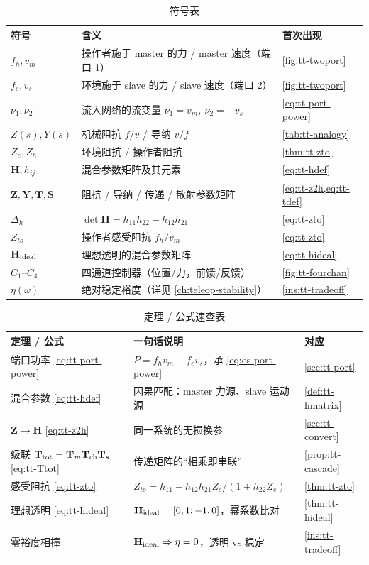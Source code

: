 \begin{table}[H]\centering\small
\caption{符号表}
\label{tab:tt-symbols}
\begin{tabular}{lll}
\toprule
符号 & 含义 & 首次出现 \\
\midrule
$f_h,v_m$ & 操作者施于 master 的力 / master 速度（端口 1） & \cref{fig:tt-twoport} \\
$f_e,v_s$ & 环境施于 slave 的力 / slave 速度（端口 2） & \cref{fig:tt-twoport} \\
$\nu_1,\nu_2$ & 流入网络的流变量 $\nu_1=v_m,\ \nu_2=-v_s$ & \cref{eq:tt-port-power} \\
$Z(s),Y(s)$ & 机械阻抗 $f/v$ / 导纳 $v/f$ & \cref{tab:tt-analogy} \\
$Z_e,Z_h$ & 环境阻抗 / 操作者阻抗 & \cref{thm:tt-zto} \\
$\mathbf H,h_{ij}$ & 混合参数矩阵及其元素 & \cref{eq:tt-hdef} \\
$\mathbf Z,\mathbf Y,\mathbf T,\mathbf S$ & 阻抗 / 导纳 / 传递 / 散射参数矩阵 & \cref{eq:tt-z2h,eq:tt-tdef} \\
$\Delta_h$ & $\det\mathbf H=h_{11}h_{22}-h_{12}h_{21}$ & \cref{eq:tt-zto} \\
$Z_{to}$ & 操作者感受阻抗 $f_h/v_m$ & \cref{eq:tt-zto} \\
$\mathbf H_{\rm ideal}$ & 理想透明的混合参数矩阵 & \cref{eq:tt-hideal} \\
$C_1$--$C_4$ & 四通道控制器（位置/力，前馈/反馈） & \cref{fig:tt-fourchan} \\
$\eta(\omega)$ & 绝对稳定裕度（详见 \cref{ch:teleop-stability}） & \cref{ins:tt-tradeoff} \\
\bottomrule
\end{tabular}
\end{table}

\begin{table}[H]\centering\small
\caption{定理 / 公式速查表}
\label{tab:tt-cheatsheet}
\begin{tabular}{lll}
\toprule
定理 / 公式 & 一句话说明 & 对应 \\
\midrule
端口功率 \cref{eq:tt-port-power} & $P=f_hv_m-f_ev_s$，承 \cref{eq:os-port-power} & \cref{sec:tt-port} \\
混合参数 \cref{eq:tt-hdef} & 因果匹配：master 力源、slave 运动源 & \cref{def:tt-hmatrix} \\
$\mathbf Z\to\mathbf H$ \cref{eq:tt-z2h} & 同一系统的无损换参 & \cref{sec:tt-convert} \\
级联 $\mathbf T_{\rm tot}=\mathbf T_m\mathbf T_{\rm ch}\mathbf T_s$ \cref{eq:tt-Ttot} & 传递矩阵的“相乘即串联” & \cref{prop:tt-cascade} \\
感受阻抗 \cref{eq:tt-zto} & $Z_{to}=h_{11}-h_{12}h_{21}Z_e/(1+h_{22}Z_e)$ & \cref{thm:tt-zto} \\
理想透明 \cref{eq:tt-hideal} & $\mathbf H_{\rm ideal}=[0,1;-1,0]$，幂系数比对 & \cref{thm:tt-hideal} \\
零裕度相撞 & $\mathbf H_{\rm ideal}\Rightarrow\eta=0$，透明 vs 稳定 & \cref{ins:tt-tradeoff} \\
\bottomrule
\end{tabular}
\end{table}

